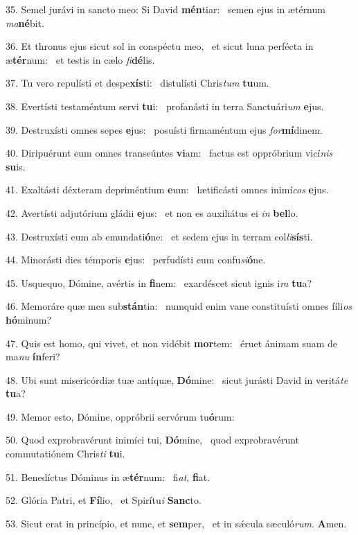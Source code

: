 35. Semel jurávi in sancto meo: Si David \textbf{mén}tiar: \ast\  semen ejus in ætérnum \textit{ma}\textbf{né}bit.\

36. Et thronus ejus sicut sol in conspéctu meo, \dag\  et sicut luna perfécta in æ\textbf{tér}num: \ast\  et testis in cælo \textit{fi}\textbf{dé}lis.\

37. Tu vero repulísti et despe\textbf{xís}ti: \ast\  distulísti Chris\textit{tum} \textbf{tu}um.\

38. Evertísti testaméntum servi \textbf{tu}i: \ast\  profanásti in terra Sanctuári\textit{um} \textbf{e}jus.\

39. Destruxísti omnes sepes \textbf{e}jus: \ast\  posuísti firmaméntum ejus \textit{for}\textbf{mí}dinem.\

40. Diripuérunt eum omnes transeúntes \textbf{vi}am: \ast\  factus est oppróbrium vicí\textit{nis} \textbf{su}is.\

41. Exaltásti déxteram depriméntium \textbf{e}um: \ast\  lætificásti omnes inimí\textit{cos} \textbf{e}jus.\

42. Avertísti adjutórium gládii \textbf{e}jus: \ast\  et non es auxiliátus ei \textit{in} \textbf{bel}lo.\

43. Destruxísti eum ab emundati\textbf{ó}ne: \ast\  et sedem ejus in terram col\textit{li}\textbf{sís}ti.\

44. Minorásti dies témporis \textbf{e}jus: \ast\  perfudísti eum confu\textit{si}\textbf{ó}ne.\

45. Usquequo, Dómine, avértis in \textbf{fi}nem: \ast\  exardéscet sicut ignis i\textit{ra} \textbf{tu}a?\

46. Memoráre quæ mea sub\textbf{stán}tia: \ast\  numquid enim vane constituísti omnes fíli\textit{os} \textbf{hó}minum?\

47. Quis est homo, qui vivet, et non vidébit \textbf{mor}tem: \ast\  éruet ánimam suam de ma\textit{nu} \textbf{ín}feri?\

48. Ubi sunt misericórdiæ tuæ antíquæ, \textbf{Dó}mine: \ast\  sicut jurásti David in veritá\textit{te} \textbf{tu}a?\

49. Memor esto, Dómine, oppróbrii servórum tu\textbf{ó}rum: \ast\  \

50. Quod exprobravérunt inimíci tui, \textbf{Dó}mine, \ast\  quod exprobravérunt commutatiónem Chris\textit{ti} \textbf{tu}i.\

51. Benedíctus Dóminus in æ\textbf{tér}num: \ast\  fi\textit{at}, \textbf{fi}at.\

52. Glória Patri, et \textbf{Fí}lio, \ast\  et Spirítu\textit{i} \textbf{Sanc}to.\

53. Sicut erat in princípio, et nunc, et \textbf{sem}per, \ast\  et in sǽcula sæculó\textit{rum}. \textbf{A}men.\

